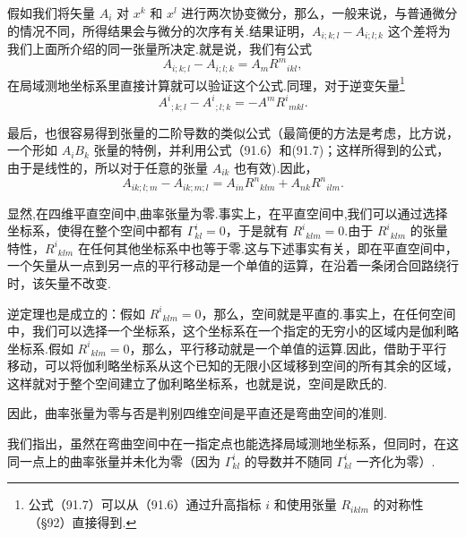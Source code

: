 假如我们将矢量 $A_i$ 对 $x^k$ 和 $x^l$ 进行两次协变微分，那么，一般来说，与普通微分的情况不同，所得结果会与微分的次序有关.结果证明，$A_{i;k;l}-A_{i;l;k}$ 这个差将为我们上面所介绍的同一张量所决定.就是说，我们有公式
\begin{equation}
  A_{i;k;l}-A_{i;l;k}=A_mR^m{}_{ikl},
\end{equation}
在局域测地坐标系里直接计算就可以验证这个公式.同理，对于逆变矢量\footnote{公式（91.7）可以从（91.6）通过升高指标 $i$ 和使用张量 $R_{iklm}$ 的对称性（§92）直接得到.}
\begin{equation}
  A^i{}_{;k;l}-A^i{}_{;l;k}=-A^mR^i{}_{mkl}.
\end{equation}

最后，也很容易得到张量的二阶导数的类似公式（最简便的方法是考虑，比方说，一个形如 $A_iB_k$ 张量的特例，并利用公式（91.6）和(91.7)；这样所得到的公式，由于是线性的，所以对于任意的张量 $A_{ik}$ 也有效).因此，
\begin{equation}
  A_{ik;l;m}-A_{ik;m;l}
  =A_{in}R^n{}_{klm}+A_{nk}R^n{}_{ilm}.
\end{equation}

显然,在四维平直空间中,曲率张量为零.事实上，在平直空间中,我们可以通过选择坐标系，使得在整个空间中都有 $\Gamma^i_{kl}=0$，于是就有 $R^i{}_{klm}=0$.由于 $R^i{}_{klm}$ 的张量特性，$R^i{}_{klm}$ 在任何其他坐标系中也等于零.这与下述事实有关，即在平直空间中，一个矢量从一点到另一点的平行移动是一个单值的运算，在沿着一条闭合回路绕行时，该矢量不改变.

逆定理也是成立的：假如 $R^i{}_{klm}=0$，那么，空间就是平直的.事实上，在任何空间中，我们可以选择一个坐标系，这个坐标系在一个指定的无穷小的区域内是伽利略坐标系.假如 $R^i{}_{klm}=0$，那么，平行移动就是一个单值的运算.因此，借助于平行移动，可以将伽利略坐标系从这个已知的无限小区域移到空间的所有其余的区域，这样就对于整个空间建立了伽利略坐标系，也就是说，空间是欧氏的.

因此，曲率张量为零与否是判别四维空间是平直还是弯曲空间的准则.

我们指出，虽然在弯曲空间中在一指定点也能选择局域测地坐标系，但同时，在这同一点上的曲率张量并未化为零（因为 $\Gamma^i_{kl}$ 的导数并不随同 $\Gamma^i_{kl}$ 一齐化为零）.

